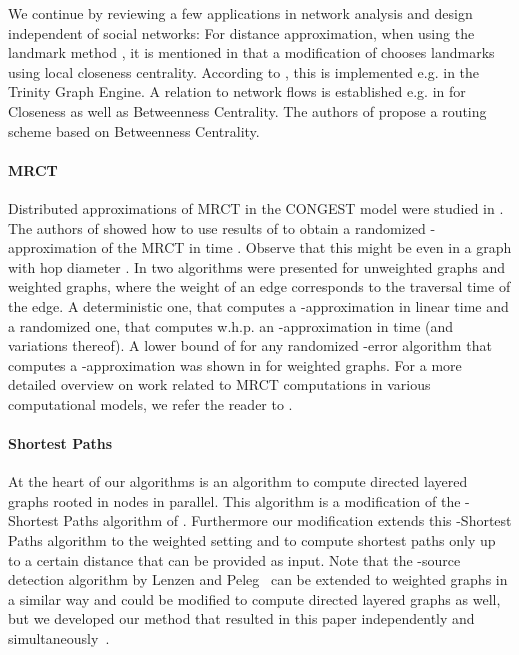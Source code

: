 \documentclass[11pt]{article}
\newcommand{\todoI}[1]{}\newcommand{\blueI}[1]{}
\begin{document}
We continue by reviewing a few applications in network analysis and design independent of social networks: For distance approximation, when using the landmark method \cite{ng2002predicting,pias2003lighthouses}, it is mentioned in \cite{aggarwal2010survey} that a modification of \cite{rattigan2007graph} chooses landmarks using local closeness centrality. According to \cite{shao2013trinity}, this is  implemented e.g. in the Trinity Graph Engine.
A relation to network flows is established e.g. in \cite{borgatti2005centrality} for Closeness as well as Betweenness Centrality. The authors of \cite{daly2007social} propose a routing scheme based on Betweenness Centrality. \todoI{wiki has more stuff on routing}

\paragraph{MRCT}
Distributed approximations of MRCT in the CONGEST model were studied in \cite{hochuli:holzer:MRCST, khan2008efficient, sarma12}. The authors of \cite{khan2008efficient} showed how to use results of \cite{fakcharoenphol2003tight} to obtain a randomized -approximation of the MRCT in time . Observe that this might be  even in a graph with hop diameter . In \cite{hochuli:holzer:MRCST} two algorithms were presented for unweighted graphs and weighted graphs, where the weight of an edge corresponds to the traversal time of the edge. A deterministic one, that computes a -approximation in linear time  and a randomized one, that computes w.h.p. an -approximation in time  (and variations thereof). A lower bound of  for any randomized -error algorithm that computes a  -approximation was shown in \cite{sarma12} for weighted graphs. For a more detailed overview on work related to MRCT computations in various computational models, we refer the reader to \cite{hochuli:holzer:MRCST}.

\paragraph{Shortest Paths}
At the heart of our algorithms is an algorithm to compute  directed layered graphs rooted in nodes  in parallel. This algorithm is a modification of the -Shortest Paths algorithm of \cite{holzer2012optimal}. Furthermore our modification extends this -Shortest Paths algorithm to the weighted setting and to compute shortest paths only up to a certain distance that can be provided as input. Note that the -source detection algorithm by Lenzen and Peleg~\cite{lenzen2013efficient} can be extended to weighted graphs in a similar way and could be modified to compute directed layered graphs as well, but we developed our method that resulted in this paper independently and simultaneously~\cite{dissler-thesis,holzer2013phd}.
\end{document}
